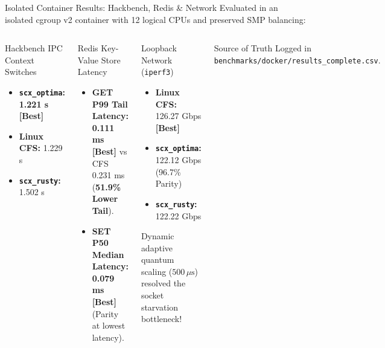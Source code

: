 \documentclass{beamer}
\begin{document}
\begin{frame}{Isolated Container Results: Hackbench, Redis \& Network}
  \footnotesize
  Evaluated in an isolated cgroup v2 container with 12 logical CPUs and preserved SMP balancing:
  \vspace{0.1cm}

  \begin{columns}[T]
      \begin{block}{\small Hackbench IPC Context Switches}
        \tiny
        \begin{itemize}\itemsep2pt
          \item \textbf{\texttt{scx\_optima}:} \textbf{1.221 s} \textcolor{AccentOrange}{\textbf{[Best]}}
          \item \textbf{Linux CFS:} 1.229 s
          \item \textbf{\texttt{scx\_rusty}:} 1.502 s
        \end{itemize}
      \end{block}

      \begin{exampleblock}{\small Redis Key-Value Store Latency}
        \tiny
        \begin{itemize}\itemsep2pt
          \item \textbf{GET P99 Tail Latency:} \textbf{0.111 ms} \textcolor{AccentOrange}{\textbf{[Best]}} vs CFS 0.231 ms (\textbf{51.9\% Lower Tail}).
          \item \textbf{SET P50 Median Latency:} \textbf{0.079 ms} \textcolor{AccentOrange}{\textbf{[Best]}} (Parity at lowest latency).
        \end{itemize}
      \end{exampleblock}

      \begin{block}{\small Loopback Network (\texttt{iperf3})}
        \tiny
        \begin{itemize}\itemsep2pt
          \item \textbf{Linux CFS:} 126.27 Gbps \textcolor{AccentOrange}{\textbf{[Best]}}
          \item \textbf{\texttt{scx\_optima}:} 122.12 Gbps (96.7\% Parity)
          \item \textbf{\texttt{scx\_rusty}:} 122.22 Gbps
        \end{itemize}
        Dynamic adaptive quantum scaling ($500\,\mu\text{s}$) resolved the socket starvation bottleneck!
      \end{block}

      \begin{alertblock}{\small Source of Truth}
        \tiny
        Logged in \texttt{benchmarks/docker/results\_complete.csv}.
      \end{alertblock}
  \end{columns}
\end{frame}
\end{document}
